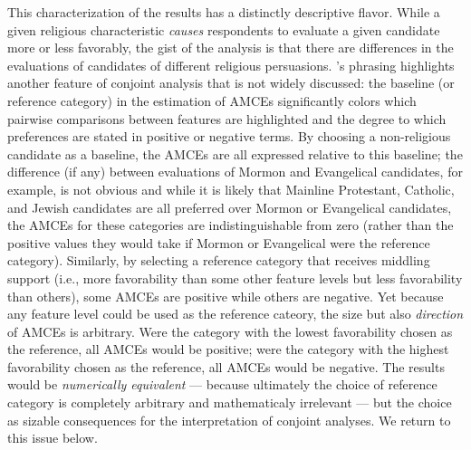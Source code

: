 \documentclass[a4paper,12pt]{article}\usepackage[]{graphicx}\usepackage[]{color}
\begin{document}
This characterization of the results has a distinctly descriptive flavor. While a given religious characteristic \textit{causes} respondents to evaluate a given candidate more or less favorably, the gist of the analysis is that there are differences in the evaluations of candidates of different religious persuasions. \citeauthor{HainmuellerHopkinsYamamoto2014}'s phrasing highlights another feature of conjoint analysis that is not widely discussed: the baseline (or reference category) in the estimation of AMCEs significantly colors which pairwise comparisons between features are highlighted and the degree to which preferences are stated in positive or negative terms. By choosing a non-religious candidate as a baseline, the AMCEs are all expressed relative to this baseline; the difference (if any) between evaluations of Mormon and Evangelical candidates, for example, is not obvious and while it is likely that Mainline Protestant, Catholic, and Jewish candidates are all preferred over Mormon or Evangelical candidates, the AMCEs for these categories are indistinguishable from zero (rather than the positive values they would take if Mormon or Evangelical were the reference category). Similarly, by selecting a reference category that receives middling support (i.e., more favorability than some other feature levels but less favorability than others), some AMCEs are positive while others are negative. Yet because any feature level could be used as the reference cateory, the size but also \textit{direction} of AMCEs is arbitrary. Were the category with the lowest favorability chosen as the reference, all AMCEs would be positive; were the category with the highest favorability chosen as the reference, all AMCEs would be negative. The results would be \textit{numerically equivalent} --- because ultimately the choice of reference category is completely arbitrary and mathematicaly irrelevant --- but the choice as sizable consequences for the interpretation of conjoint analyses. We return to this issue below.
\end{document}
